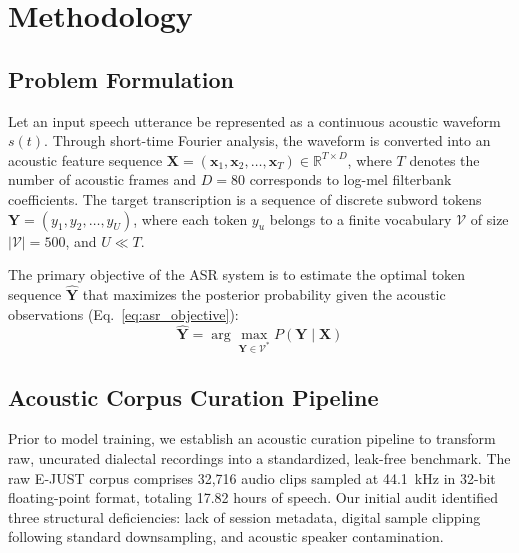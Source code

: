 \documentclass[journal]{IEEEtran}
\begin{document}
\section{Methodology}
\label{sec:methodology}

\subsection{Problem Formulation}
Let an input speech utterance be represented as a continuous acoustic waveform $s(t)$. Through short-time Fourier analysis, the waveform is converted into an acoustic feature sequence $\mathbf{X} = (\mathbf{x}_1, \mathbf{x}_2, \dots, \mathbf{x}_T) \in \mathbb{R}^{T \times D}$, where $T$ denotes the number of acoustic frames and $D = 80$ corresponds to log-mel filterbank coefficients. The target transcription is a sequence of discrete subword tokens $\mathbf{Y} = (y_1, y_2, \dots, y_U)$, where each token $y_u$ belongs to a finite vocabulary $\mathcal{V}$ of size $|\mathcal{V}| = 500$, and $U \ll T$.

The primary objective of the ASR system is to estimate the optimal token sequence $\hat{\mathbf{Y}}$ that maximizes the posterior probability given the acoustic observations (Eq.~\ref{eq:asr_objective}):
\begin{equation}
\hat{\mathbf{Y}} = \arg\max_{\mathbf{Y} \in \mathcal{V}^*} P(\mathbf{Y} \mid \mathbf{X})
\label{eq:asr_objective}
\end{equation}

\subsection{Acoustic Corpus Curation Pipeline}
\label{sec:curation}
Prior to model training, we establish an acoustic curation pipeline to transform raw, uncurated dialectal recordings into a standardized, leak-free benchmark. The raw E-JUST corpus comprises 32,716 audio clips sampled at 44.1~kHz in 32-bit floating-point format, totaling 17.82 hours of speech. Our initial audit identified three structural deficiencies: lack of session metadata, digital sample clipping following standard downsampling, and acoustic speaker contamination.
\end{document}
